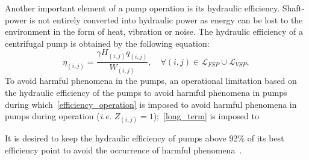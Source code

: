     \par Another important element of a pump operation is its hydraulic efficiency. Shaft-power is not entirely converted into hydraulic power as energy can be lost to the environment in the form of heat, vibration or noise. The hydraulic efficiency of a centrifugal pump is obtained by the following equation:
    \begin{equation}
        \eta_{(i,j)} = \frac{\gamma H_{(i,j)}q_{(i,j)}}{W_{(i,j)}}, \quad \forall (i,j) \in \mathcal{L}_{FSP}\cup \mathcal{L}_{VSP},\label{VSP:Qeta}    
    \end{equation}
    To avoid harmful phenomena in the pumps, an operational limitation based on the hydraulic efficiency of the pumps to avoid harmful phenomena in pumps during
    which~\eqref{efficiency_operation} is imposed to avoid harmful phenomena in pumps during operation (\textit{i.e.} $Z_{(i,j)}=1$);~\eqref{long_term} is imposed to 

    It is desired to keep the hydraulic efficiency of pumps above 92\% of its best efficiency point to avoid the occurrence of harmful phenomena~\citep{Barringer2003}.
